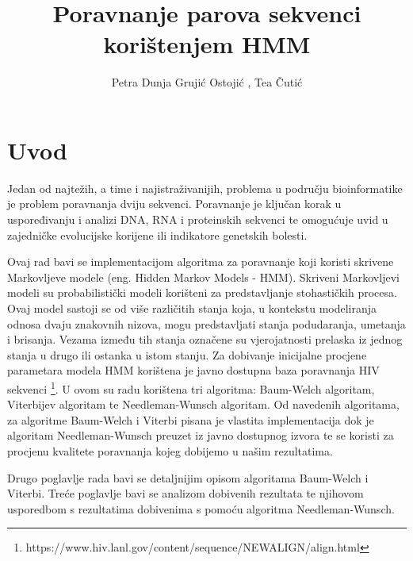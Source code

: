 \documentclass[times, utf8, seminar, numeric]{fer}
\begin{document}
\title{Poravnanje parova sekvenci korištenjem HMM}

\author{Petra Dunja Grujić Ostojić , Tea Čutić}


\maketitle

\tableofcontents

\chapter{Uvod}
Jedan od najtežih, a time i najistraživanijih, problema u području bioinformatike je problem poravnanja dviju sekvenci. Poravnanje je ključan korak u uspoređivanju i analizi DNA, RNA i proteinskih sekvenci te omogućuje uvid u zajedničke evolucijske korijene ili indikatore genetskih bolesti.

\bigskip

Ovaj rad bavi se implementacijom algoritma za poravnanje koji koristi skrivene  Markovljeve modele (eng. Hidden Markov Models - HMM). Skriveni Markovljevi modeli su probabilistički modeli korišteni za predstavljanje stohastičkih procesa. Ovaj model sastoji se od više različitih stanja koja, u kontekstu modeliranja odnosa dvaju znakovnih nizova, mogu predstavljati stanja podudaranja, umetanja i brisanja. Vezama između tih stanja označene su vjerojatnosti prelaska iz jednog stanja u drugo ili ostanka u istom stanju. Za dobivanje inicijalne procjene parametara modela HMM korištena je javno dostupna baza poravnanja HIV sekvenci \footnote{https://www.hiv.lanl.gov/content/sequence/NEWALIGN/align.html}. U ovom su radu korištena tri algoritma: Baum-Welch algoritam, Viterbijev algoritam te Needleman-Wunsch algoritam. Od navedenih algoritama, za algoritme Baum-Welch i Viterbi pisana je vlastita implementacija dok je algoritam Needleman-Wunsch preuzet iz javno dostupnog izvora te se koristi za procjenu kvalitete poravnanja kojeg dobijemo u našim rezultatima.

\bigskip

Drugo poglavlje rada bavi se detaljnijim opisom algoritama Baum-Welch i Viterbi. Treće poglavlje bavi se analizom dobivenih rezultata te njihovom usporedbom s rezultatima dobivenima s pomoću algoritma Needleman-Wunsch.
\end{document}
